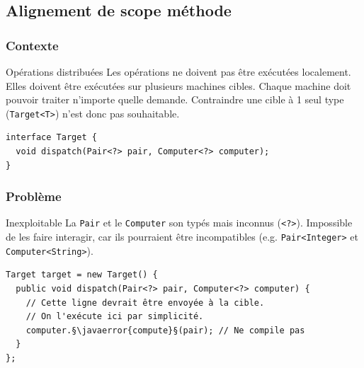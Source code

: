\documentclass[draft]{beamer}
\makeatletter
\def\uwave{\bgroup\markoverwith{\lower4\p@\hbox{\sixly \textcolor{errorcolor}{\char58}}}\ULon}
\newcommand{\javaerror}[1]{%
  \uwave{#1}%
}
\makeatother
\begin{document}
\subsection{Alignement de scope méthode}

\begin{frame}[fragile]
\frametitle{Contexte}
\begin{block}{Opérations distribuées}
 Les opérations ne doivent pas être exécutées localement.
 Elles doivent être exécutées sur plusieurs machines cibles.
 Chaque machine doit pouvoir traiter n'importe quelle demande.
 Contraindre une cible à 1 seul type (\lstinline{Target<T>}) n'est donc pas souhaitable.
\end{block}
\begin{lstlisting}
interface Target {
  void dispatch(Pair<?> pair, Computer<?> computer);
}
\end{lstlisting}
\end{frame}

\begin{frame}[fragile]
\frametitle{Problème}
\begin{alertblock}{Inexploitable}
 La \lstinline{Pair} et le \lstinline{Computer} son typés mais inconnus (\lstinline{<?>}).
 Impossible de les faire interagir, car ils pourraient être incompatibles (e.g. \lstinline{Pair<Integer>} et \lstinline{Computer<String>}).
\end{alertblock}
\begin{lstlisting}
Target target = new Target() {
  public void dispatch(Pair<?> pair, Computer<?> computer) {
    // Cette ligne devrait être envoyée à la cible.
    // On l'exécute ici par simplicité.
    computer.§\javaerror{compute}§(pair); // Ne compile pas
  }
};
\end{lstlisting}
\end{frame}
\end{document}
